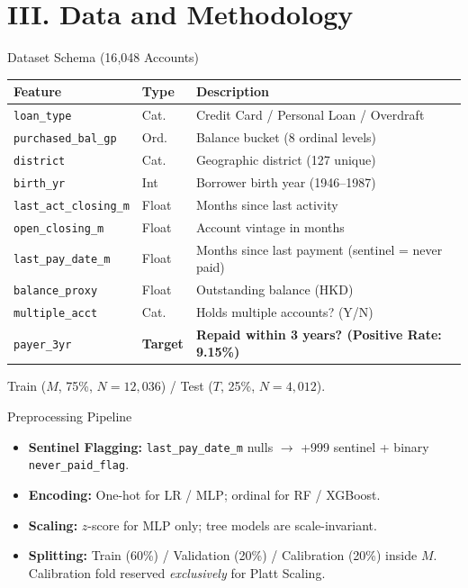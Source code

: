 \documentclass[10pt]{beamer}
\begin{document}
\section{III. Data and Methodology}

\begin{frame}{\textrm{Dataset Schema (16{,}048 Accounts)}}
\centering
\scriptsize
\begin{tabular}{@{}llp{5.5cm}@{}}
\toprule
\textbf{Feature} & \textbf{Type} & \textbf{Description}\\
\midrule
\texttt{loan\_type}            & Cat.   & Credit Card / Personal Loan / Overdraft\\
\texttt{purchased\_bal\_gp}    & Ord.   & Balance bucket (8 ordinal levels)\\
\texttt{district}              & Cat.   & Geographic district (127 unique)\\
\texttt{birth\_yr}             & Int    & Borrower birth year (1946--1987)\\
\texttt{last\_act\_closing\_m} & Float  & Months since last activity\\
\texttt{open\_closing\_m}      & Float  & Account vintage in months\\
\texttt{last\_pay\_date\_m}    & Float  & Months since last payment (sentinel = never paid)\\
\texttt{balance\_proxy}        & Float  & Outstanding balance (HKD)\\
\texttt{multiple\_acct}        & Cat.   & Holds multiple accounts? (Y/N)\\
\midrule
\texttt{payer\_3yr}            & \textbf{Target} & \textbf{Repaid within 3 years? (Positive Rate: 9.15\%)}\\
\bottomrule
\end{tabular}
\vfill
\scriptsize Train ($M$, 75\%, $N=12{,}036$) / Test ($T$, 25\%, $N=4{,}012$).
\end{frame}

\begin{frame}{\textrm{Preprocessing Pipeline}}
    \begin{itemize}
        \item \textbf{Sentinel Flagging:} \texttt{last\_pay\_date\_m} nulls $\to$ +999 sentinel + binary \texttt{never\_paid\_flag}.
        \item \textbf{Encoding:} One-hot for LR / MLP; ordinal for RF / XGBoost.
        \item \textbf{Scaling:} $z$-score for MLP only; tree models are scale-invariant.
        \item \textbf{Splitting:} Train (60\%) / Validation (20\%) / Calibration (20\%) inside $M$. Calibration fold reserved \emph{exclusively} for Platt Scaling.
    \end{itemize}
\end{frame}
\end{document}

